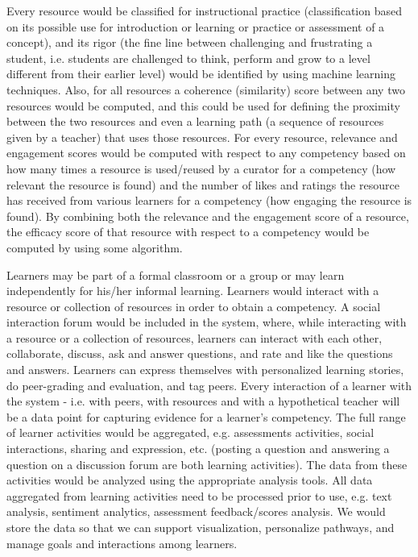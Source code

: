 \begin{multicols}{2}
Every resource would be classified for instructional practice (classification based on its possible use for introduction or learning or practice or assessment of a concept), and its rigor (the fine line between challenging and frustrating a student, i.e. students are challenged to think, perform and grow to a level different from their earlier level) would be identified by using machine learning techniques. Also, for all resources a coherence (similarity) score between any two resources would be computed, and this could be used for defining the proximity between the two resources and even a learning path (a sequence of resources given by a teacher) that uses those resources. For every resource, relevance and engagement scores would be computed with respect to any competency based on how many times a resource is used/reused by a curator for a competency (how relevant the resource is found) and the number of likes and ratings the resource has received from various learners for a competency (how engaging the resource is found). By combining both the relevance and the engagement score of a resource, the efficacy score of that resource with respect to a competency would be computed by using some algorithm.

Learners may be part of a formal classroom or a group or may learn independently for his/her informal learning. Learners would interact with a resource or collection of resources in order to obtain a competency. A social interaction forum would be included in the system, where, while interacting with a resource or a collection of resources, learners can interact with each other, collaborate, discuss, ask and answer questions, and rate and like the questions and answers. Learners can express themselves with personalized learning stories, do peer-grading and evaluation, and tag peers. Every interaction of a learner with the system - i.e. with peers, with resources and with a hypothetical teacher will be a data point for capturing evidence for a learner’s competency. The full range of learner activities would be aggregated, e.g. assessments activities, social interactions, sharing and expression, etc. (posting a question and answering a question on a discussion forum are both learning activities). The data from these activities would be analyzed using the appropriate analysis tools. All data aggregated from learning  activities need to be processed prior to use, e.g. text analysis, sentiment analytics, assessment feedback/scores analysis. We would store the data so that we can support visualization, personalize pathways, and manage goals and interactions among learners.


\end{multicols}
